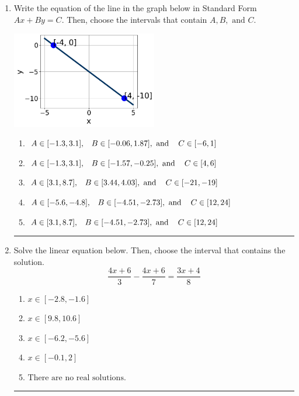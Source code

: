 \documentclass[14pt]{extbook}
\newcommand{\litem}[1]{\item#1\hspace*{-1cm}\rule{\textwidth}{0.4pt}}
\begin{document}
\begin{enumerate}
{\begin{enumerate}[label=\Alph*.]
\end{enumerate} }
\litem{
Write the equation of the line in the graph below in Standard Form $Ax+By=C$. Then, choose the intervals that contain $A, B, \text{ and } C$.
\begin{center}
    \includegraphics[width=0.5\textwidth]{../Figures/linearGraphToStandardCopyA.png}
\end{center}
\begin{enumerate}[label=\Alph*.]
\item \( A \in [-1.3, 3.1], \hspace{3mm} B \in [-0.06, 1.87], \text{ and } \hspace{3mm} C \in [-6, 1] \)
\item \( A \in [-1.3, 3.1], \hspace{3mm} B \in [-1.57, -0.25], \text{ and } \hspace{3mm} C \in [4, 6] \)
\item \( A \in [3.1, 8.7], \hspace{3mm} B \in [3.44, 4.03], \text{ and } \hspace{3mm} C \in [-21, -19] \)
\item \( A \in [-5.6, -4.8], \hspace{3mm} B \in [-4.51, -2.73], \text{ and } \hspace{3mm} C \in [12, 24] \)
\item \( A \in [3.1, 8.7], \hspace{3mm} B \in [-4.51, -2.73], \text{ and } \hspace{3mm} C \in [12, 24] \)

\end{enumerate} }
\litem{
Solve the linear equation below. Then, choose the interval that contains the solution.\[ \frac{4x + 6}{3} - \frac{4x + 6}{7} = \frac{3x + 4}{8} \]\begin{enumerate}[label=\Alph*.]
\item \( x \in [-2.8, -1.6] \)
\item \( x \in [9.8, 10.6] \)
\item \( x \in [-6.2, -5.6] \)
\item \( x \in [-0.1, 2] \)
\item \( \text{There are no real solutions.} \)


\end{enumerate}}
\end{enumerate}
\end{document}
